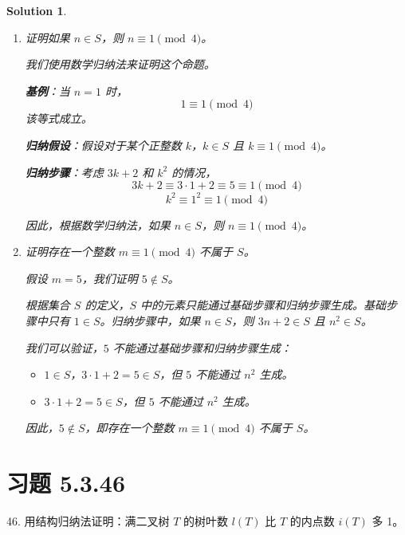 \documentclass[UTF8]{report}
\newtheorem{solution}{Solution}
\theoremstyle{MyLineTheoremStyle} %
\theoremstyle{MyBlockTheoremStyle} %
\theoremstyle{MySubsubsectionStyle} %
\begin{document}
\begin{solution}
    \begin{enumerate}
        \item 证明如果 $n \in S$，则 $n \equiv 1 \pmod{4}$。

        我们使用数学归纳法来证明这个命题。

        \textbf{基例}：当 $n = 1$ 时，
        \[
        1 \equiv 1 \pmod{4}
        \]
        该等式成立。

        \textbf{归纳假设}：假设对于某个正整数 $k$，$k \in S$ 且 $k \equiv 1 \pmod{4}$。

        \textbf{归纳步骤}：考虑 $3k+2$ 和 $k^2$ 的情况，
        \[
        3k+2 \equiv 3 \cdot 1 + 2 \equiv 5 \equiv 1 \pmod{4}
        \]
        \[
        k^2 \equiv 1^2 \equiv 1 \pmod{4}
        \]

        因此，根据数学归纳法，如果 $n \in S$，则 $n \equiv 1 \pmod{4}$。

        \item 证明存在一个整数 $m \equiv 1 \pmod{4}$ 不属于 $S$。

        假设 $m = 5$，我们证明 $5 \notin S$。

        根据集合 $S$ 的定义，$S$ 中的元素只能通过基础步骤和归纳步骤生成。基础步骤中只有 $1 \in S$。归纳步骤中，如果 $n \in S$，则 $3n+2 \in S$ 且 $n^2 \in S$。

        我们可以验证，$5$ 不能通过基础步骤和归纳步骤生成：
        \begin{itemize}
            \item $1 \in S$，$3 \cdot 1 + 2 = 5 \in S$，但 $5$ 不能通过 $n^2$ 生成。
            \item $3 \cdot 1 + 2 = 5 \in S$，但 $5$ 不能通过 $n^2$ 生成。
        \end{itemize}

        因此，$5 \notin S$，即存在一个整数 $m \equiv 1 \pmod{4}$ 不属于 $S$。
    \end{enumerate}
\end{solution}

\section{习题 5.3.46}
46. 用结构归纳法证明：满二叉树 $T$ 的树叶数 $l(T)$ 比 $T$ 的内点数 $i(T)$ 多 1。
\end{document}
